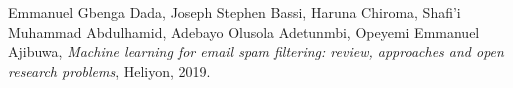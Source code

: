 \documentclass[lettersize,journal]{IEEEtran}
\begin{document}
\begin{thebibliography}{1}
Emmanuel Gbenga Dada, Joseph Stephen Bassi, Haruna Chiroma, Shafi'i Muhammad Abdulhamid, Adebayo Olusola Adetunmbi, Opeyemi Emmanuel Ajibuwa, {\it{Machine learning for email spam filtering: review, approaches and open research problems}}, Heliyon, 2019.



\end{thebibliography}
\end{document}
